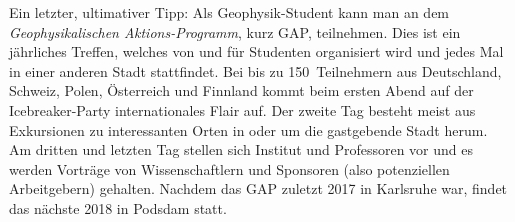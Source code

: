 \begin{multicols}{2}
Ein letzter, ultimativer Tipp: Als Geophysik-Student kann man an dem \emph{Geophysikalischen Aktions-Programm}, kurz GAP, teilnehmen.
Dies ist ein jährliches Treffen, welches von und für Studenten organisiert wird und jedes Mal in einer anderen Stadt stattfindet.
Bei bis zu 150~Teilnehmern aus Deutschland, Schweiz, Polen, Österreich und Finnland kommt beim ersten Abend auf der Icebreaker-Party internationales Flair auf.
Der zweite Tag besteht meist aus Exkursionen zu interessanten Orten in oder um die gastgebende Stadt herum.
Am dritten und letzten Tag stellen sich Institut und Professoren vor und es werden Vorträge von Wissenschaftlern und Sponsoren (also potenziellen Arbeitgebern) gehalten.
Nachdem das GAP zuletzt 2017 in Karlsruhe war, findet das nächste 2018 in Podsdam statt.

\end{multicols}

